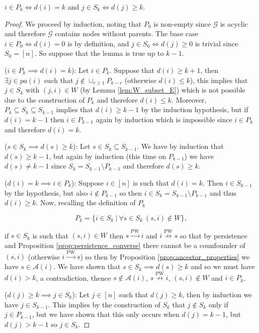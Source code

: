 \documentclass[12pt]{article}
\def\pwgc{\overset{\text{PW}}{\rightarrow}}  %
\def\npwgc{\overset{\text{PW}}{\nrightarrow}}  %
\def\gcg{\mathcal{G}}  %
\newcommand{\pa}[1]{pa(#1)}  %
\newcommand{\anc}[1]{\mathcal{A}(#1)}  %
\begin{document}
\begin{lemma}
  \label{lem:depth_lemma}
  $i \in P_k \iff d(i) = k$ and $j \in S_k \iff d(j) \ge k$.
\end{lemma}
\begin{proof}
  We proceed by induction, noting that $P_0$ is non-empty since $\gcg$
  is acyclic and therefore $\gcg$ contains nodes without parents.  The
  base case $i \in P_0 \iff d(i) = 0$ is by definition, and
  $j \in S_0 \iff d(j) \ge 0$ is trivial since $S_0 = [n]$.  So
  suppose that the lemma is true up to $k - 1$.

  ($i \in P_k \implies d(i) = k$): Let $i \in P_k$.  Suppose that
  $d(i) \ge k + 1$, then $\exists j \in \pa{i}$ such that
  $j \not\in \cup_{r \ge 1}P_{k - r}$ (otherwise $d(i) \le k$), this
  implies that $j \in S_k$ with $(j, i) \in W$ (by Lemma
  \ref{lem:W_subset_E}) which is not possible due to the construction of
  $P_k$ and therefore $d(i) \le k$.  Moreover,
  $P_k \subseteq S_k \subseteq S_{k - 1}$ implies that
  $d(i) \ge k - 1$ by the induction hypothesis, but if $d(i) = k - 1$
  then $i \in P_{k - 1}$ again by induction which is impossible since
  $i \in P_k$ and therefore $d(i) = k$.

  ($s \in S_k \implies d(s) \ge k$): Let
  $s \in S_k \subseteq S_{k - 1}$.  We have by induction that
  $d(s) \ge k - 1$, but again by induction (this time on $P_{k - 1}$)
  we have $d(s) \ne k - 1$ since $S_k = S_{k - 1} \setminus P_{k - 1}$
  and therefore $d(s) \ge k$.

  ($d(i) = k \implies i \in P_k$): Suppose $i \in [n]$ is such that
  $d(i) = k$.  Then $i \in S_{k - 1}$ by the hypothesis, but also
  $i \not\in P_{k - 1}$ so then
  $i \in S_k = S_{k - 1} \setminus P_{k - 1}$ and thus $d(i) \ge k$.
  Now, recalling the definition of $P_k$

  \begin{equation*}
    P_k = \{i \in S_k\ |\ \forall s \in S_k\ (s, i) \not\in W \},
  \end{equation*}

  if $s \in S_k$ is such that $(s, i) \in W$ then $s \pwgc i$ and
  $i \npwgc s$ so that by persistence and Proposition
  \ref{prop:persistence_converse} there cannot be a counfounder of
  $(s, i)$ (otherwise $i \pwgc s$) so then by Proposition
  \ref{prop:ancestor_properties} we have $s \in \anc{i}$.  We have
  shown that $s \in S_k \implies d(s) \ge k$ and so we must have
  $d(i) > k$, a contradiction, thence $s \not\in \anc{i}$,
  $s \npwgc i$, $(s, i) \not\in W$ and $i \in P_k$.

  ($d(j) \ge k \implies j \in S_k$): Let $j \in [n]$ such that
  $d(j) \ge k$, then by induction we have $j \in S_{k - 1}$.  This
  implies by the construction of $S_k$ that $j \not\in S_k$ only if
  $j \in P_{k - 1}$, but we have shown that this only occurs when
  $d(j) = k - 1$, but $d(j) > k - 1$ so $j \in S_k$.
\end{proof}
\end{document}
